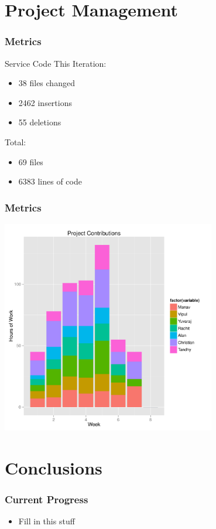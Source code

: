 \documentclass[final]{beamer}
\begin{document}
\section{Project Management}

\begin{frame}
	\frametitle{Metrics}
	\begin{beamerboxesrounded}[shadow]{Service Code}
		This Iteration:
		\begin{itemize}
			\item{38 files changed}
			\item{2462 insertions}
			\item{55 deletions}
		\end{itemize}

		Total:
		\begin{itemize}
			\item{69 files}
			\item{6383 lines of code}
		\end{itemize}
	\end{beamerboxesrounded}
\end{frame}

\begin{frame}
	\frametitle{Metrics}
	\includegraphics[width = 0.7\textwidth]{./hours_worked}
\end{frame}

\section{Conclusions}

\begin{frame}
	\frametitle{Current Progress}
	\begin{beamerboxesrounded}[shadow]{}
		\begin{itemize}
			\item{Fill in this stuff}
		\end{itemize}
	\end{beamerboxesrounded}
\end{frame}
\end{document}

